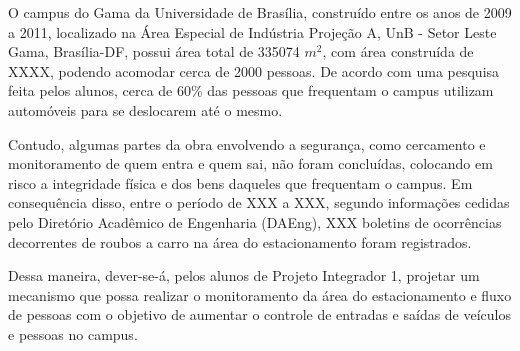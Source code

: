 O campus do Gama da Universidade de Brasília, construído entre os anos de 2009 a 2011, localizado na Área Especial de Indústria Projeção A, UnB - Setor Leste Gama, Brasília-DF, possui área total de 335074 $m^2$, com área construída de XXXX, podendo  acomodar cerca de 2000 pessoas.  De acordo com uma pesquisa feita pelos alunos, cerca de 60\% das pessoas que frequentam o campus utilizam automóveis para se deslocarem até o mesmo.

Contudo, algumas partes da obra envolvendo a segurança, como cercamento e monitoramento de quem entra e quem sai, não foram concluídas, colocando em risco a integridade física e dos bens daqueles que frequentam o campus. Em consequência disso, entre o período de XXX a XXX, segundo informações cedidas pelo Diretório Acadêmico de Engenharia (DAEng), XXX boletins de ocorrências decorrentes de roubos a carro na área do estacionamento foram registrados.

Dessa maneira, dever-se-á, pelos alunos de Projeto Integrador 1, projetar  um mecanismo que possa realizar o monitoramento  da área do estacionamento e fluxo de pessoas  com o objetivo de aumentar o controle de entradas e saídas de veículos e pessoas no campus.
